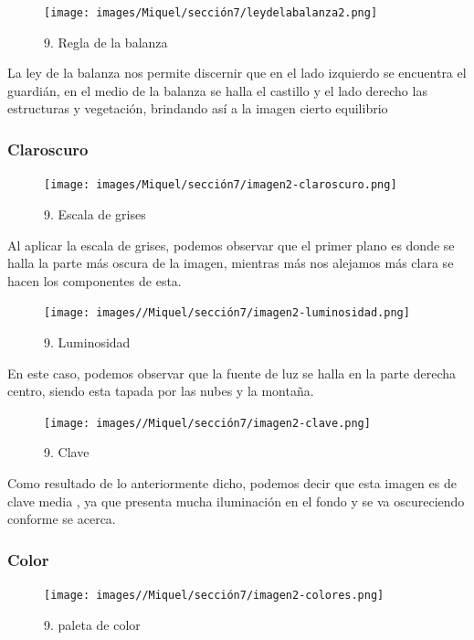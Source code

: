 \documentclass[12pt]{article}
\begin{document}
    \begin{figure}[H]
      \centering
      \texttt{[image: images/Miquel/sección7/leydelabalanza2.png]}
      \caption{\small 9. Regla de la balanza}
    \end{figure}

    La ley de la balanza nos permite discernir que en el lado izquierdo se encuentra el guardián, en el medio de la balanza se halla el castillo y el lado derecho las estructuras y vegetación, brindando así a la imagen cierto equilibrio
   
        \subsubsection{Claroscuro}

    \begin{figure}[H]
      \centering
      \texttt{[image: images/Miquel/sección7/imagen2-claroscuro.png]}
      \caption{\small 9. Escala de grises}
    \end{figure}
    
    Al aplicar la escala de grises, podemos observar que el primer plano es donde se halla la parte más oscura de la imagen, mientras más nos alejamos más clara se hacen los componentes de esta.

    \begin{figure}[H]
      \centering
      \texttt{[image: images//Miquel/sección7/imagen2-luminosidad.png]}
      \caption{\small 9. Luminosidad}
    \end{figure}

    En este caso, podemos observar que la fuente de luz se halla en la parte derecha centro, siendo esta tapada por las nubes y la montaña.
    
    \begin{figure}[H]
      \centering
      \texttt{[image: images//Miquel/sección7/imagen2-clave.png]}
      \caption{\small 9. Clave}
    \end{figure}

    Como resultado de lo anteriormente dicho, podemos decir que esta imagen es de clave media , ya que presenta mucha iluminación en el fondo y se va oscureciendo conforme se acerca.

        \subsubsection{Color}
\begin{figure}[H]
      \centering
      \texttt{[image: images//Miquel/sección7/imagen2-colores.png]}
      \caption{\small 9. paleta de color}
    \end{figure}
\end{document}
